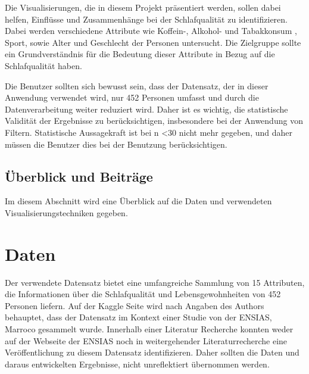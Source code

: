 \documentclass[usegeometry=true]{scrartcl}
\begin{document}
Die Visualisierungen, die in diesem Projekt präsentiert werden, sollen dabei helfen, Einflüsse und Zusammenhänge
 bei der Schlafqualität zu identifizieren. Dabei werden verschiedene Attribute wie Koffein-, Alkohol- und Tabakkonsum
 , Sport, sowie Alter und Geschlecht der Personen untersucht. Die Zielgruppe sollte ein Grundverständnis
  für die Bedeutung dieser Attribute in Bezug auf die Schlafqualität haben.

Die Benutzer sollten sich bewusst sein, dass der Datensatz, der in dieser Anwendung verwendet wird,
 nur 452 Personen umfasst und durch die Datenverarbeitung weiter reduziert wird. 
 Daher ist es wichtig, die statistische Validität der Ergebnisse zu berücksichtigen,
  insbesondere bei der Anwendung von Filtern. Statistische Aussagekraft ist bei n <30 nicht mehr gegeben,
   und daher müssen die Benutzer dies bei der Benutzung berücksichtigen.



\subsection{Überblick und Beiträge}
Im diesem Abschnitt wird eine Überblick auf die Daten und verwendeten Visualisierungstechniken gegeben. 

\section{Daten}

Der verwendete Datensatz bietet eine umfangreiche Sammlung von 15 Attributen, die Informationen 
über die Schlafqualität und Lebensgewohnheiten von 452 Personen liefern.
Auf der Kaggle Seite wird nach Angaben des Authors behauptet, dass der Datensatz im Kontext einer Studie von der ENSIAS, Marroco gesammelt wurde.
Innerhalb einer Literatur Recherche konnten weder auf der Webseite der ENSIAS noch in weitergehender Literaturrecherche eine Veröffentlichung zu diesem Datensatz identifizieren.
Daher sollten die Daten und daraus entwickelten Ergebnisse, nicht unreflektiert übernommen werden. 
\end{document}
